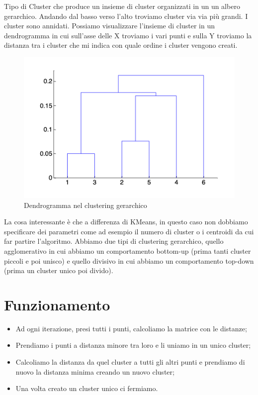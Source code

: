 \documentclass[14pt]{extreport}
\begin{document}
Tipo di Cluster che produce un insieme di cluster organizzati in un un albero gerarchico. Andando dal basso verso l'alto troviamo cluster via via più grandi.
I cluster sono annidati.
Possiamo visualizzare l'insieme di cluster in un dendrogramma in cui sull'asse delle X troviamo i vari punti e sulla Y troviamo la distanza tra i cluster che mi indica con quale ordine i cluster vengono creati.

\begin{figure}[h!]
  \includegraphics[width=\linewidth]{Dendrogramma.png}
  \caption{Dendrogramma nel clustering gerarchico}
\end{figure}

La cosa interessante è che a differenza di KMeans, in questo caso non dobbiamo specificare dei parametri come ad esempio il numero di cluster o i centroidi da cui far partire l'algoritmo.
Abbiamo due tipi di clustering gerarchico, quello agglomerativo in cui abbiamo un comportamento bottom-up (prima tanti cluster piccoli e poi unisco) e quello divisivo in cui abbiamo un comportamento top-down (prima un cluster unico poi divido).



\section{Funzionamento}

\begin{itemize}
    \item Ad ogni iterazione, presi tutti i punti, calcoliamo la matrice con le distanze;
    \item Prendiamo i punti a distanza minore tra loro e li uniamo in un unico cluster;
    \item Calcoliamo la distanza da quel cluster a tutti gli altri punti e prendiamo di nuovo la distanza minima creando un nuovo cluster;
    \item Una volta creato un cluster unico ci fermiamo.
\end{itemize}
\end{document}

